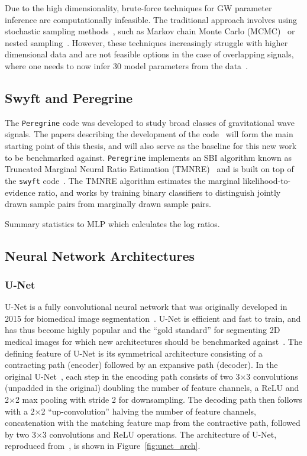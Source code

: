 Due to the high dimensionality, brute-force techniques for GW parameter inference are computationally infeasible. The traditional approach involves using stochastic sampling methods~\cite{Thrane_Talbot_2019}, such as Markov chain Monte Carlo (MCMC)~\cite{Metropolis_1953,Hastings_1970} or nested sampling~\cite{Skilling_2004}. However, these techniques increasingly struggle with higher dimensional data and are not feasible options in the case of overlapping signals, where one needs to now infer 30 model parameters from the data~\cite{alvey2023things}.


\subsection{Swyft and Peregrine}

The \texttt{Peregrine} code was developed to study broad classes of gravitational wave signals. The papers describing the development of the code~\cite{bhardwaj2023peregrine,alvey2023things} will form the main starting point of this thesis, and will also serve as the baseline for this new work to be benchmarked against. \texttt{Peregrine} implements an SBI algorithm known as Truncated Marginal Neural Ratio Estimation (TMNRE)~\cite{Miller_TMNRE_2021} and is built on top of the \texttt{swyft} code~\cite{Miller2022}. The TMNRE algorithm estimates the marginal likelihood-to-evidence ratio, and works by training binary classifiers to distinguish jointly drawn sample pairs from marginally drawn sample pairs.

Summary statistics to MLP which calculates the log ratios.

\subsection{Neural Network Architectures}

\subsubsection{U-Net}

U-Net is a fully convolutional neural network that was originally developed in 2015 for biomedical image segmentation~\cite{Ronneberger_Fischer_Brox_2015}. U-Net is efficient and fast to train, and has thus become highly popular and the \enquote{gold standard} for segmenting 2D medical images for which new architectures should be benchmarked against~\cite{Sengara_2022}. The defining feature of U-Net is its symmetrical architecture consisting of a contracting path (encoder) followed by an expansive path (decoder). In the original U-Net~\cite{Ronneberger_Fischer_Brox_2015}, each step in the encoding path consists of two 3$\times$3 convolutions (unpadded in the original) doubling the number of feature channels, a ReLU and 2$\times$2 max pooling with stride 2 for downsampling. The decoding path then follows with a 2$\times$2 \enquote{up-convolution} halving the number of feature channels, concatenation with the matching feature map from the contractive path, followed by two 3$\times$3 convolutions and ReLU operations. The architecture of U-Net, reproduced from~\cite{Ronneberger_Fischer_Brox_2015}, is shown in Figure~\ref{fig:unet_arch}.

